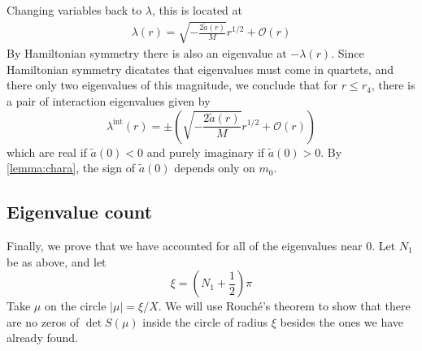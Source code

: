 \documentclass[thesis.tex]{subfiles}
\begin{document}
Changing variables back to $\lambda$, this is located at
\begin{align*}
\lambda(r) = \sqrt{-\frac{2 \tilde{a}(r)}{M}}r^{1/2} + \mathcal{O}\left( r \right)
\end{align*}
By Hamiltonian symmetry there is also an eigenvalue at $-\lambda(r)$. Since Hamiltonian symmetry  dicatates that eigenvalues must come in quartets, and there only two eigenvalues of this magnitude, we conclude that for $r \leq r_4$, there is a pair of interaction eigenvalues given by
\[
\lambda^{\text{int}}(r) = \pm \left( \sqrt{ -\frac{2 \tilde{a}(r)}{M} }r^{1/2} + \mathcal{O}\left( r \right) \right)
\]
which are real if $\tilde{a}(0) < 0$ and purely imaginary if $\tilde{a}(0) > 0$. By \cref{lemma:chara}, the sign of $\tilde{a}(0)$ depends only on $m_0$.

\subsection{Eigenvalue count}

Finally, we prove that we have accounted for all of the eigenvalues near 0. Let $N_1$ be as above, and let
\[
\xi = \left( N_1 + \frac{1}{2} \right)\pi
\]
Take $\mu$ on the circle $|\mu| = \xi/X$. We will use Rouch\'{e}'s theorem to show that there are no zeros of $\det S(\mu)$ inside the circle of radius $\xi$ besides the ones we have already found.
\end{document}
